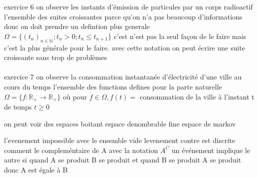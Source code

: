 \documentclass{article}
\begin{document}
exercice 6
on observe les instants d'émission de particules par un corps radioactif
l'ensemble des suites croissantes parce qu'on n'a pas beaucoup d'informations donc on doit prendre un defintion plus generale
$\Omega = \{ (t_{n})_{n \in \mathbb{N}} ; t_{n} > 0 ; t_{n} \leq t_{n+1}\}$
c'est n'est pas la seul façon de le faire mais c'est la plus générale pour le faire. avec cette notation on peut écrire une suite croissante sans trop de problèmes
\\\\

exercice 7
on observe la consommation instantanée d'électricité d'une ville au cours du temps
l'ensemble des functions defines pour la parte naturelle
$\Omega = \{ f : \mathbb{R}_{+} \to \mathbb{R}_{+} \}$ où pour $f \in \Omega, f(t) =$ consommation de la ville à l'instant t de temps $t\geq 0$

on peut voir des espaces boitant espace denombrable fine
espace de markov

l'evenement impossible avec le ensemble vide
levenement contre est discrite comment le compleméntaire de A avec la notation $A^{C}$
un événement implique le autre si quand A se produit B se produit et quand B se produit A se produit donc A est égale à B  
\end{document}
